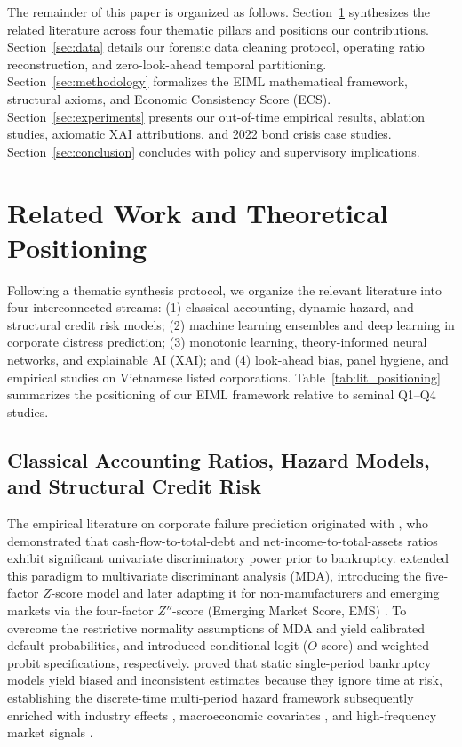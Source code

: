 \documentclass[pdflatex,sn-mathphys-num,twocolumn]{sn-jnl}
\theoremstyle{thmstyleone}
\theoremstyle{thmstyletwo}
\theoremstyle{thmstylethree}
\begin{document}
The remainder of this paper is organized as follows. Section~\ref{sec:literature} synthesizes the related literature across four thematic pillars and positions our contributions. Section~\ref{sec:data} details our forensic data cleaning protocol, operating ratio reconstruction, and zero-look-ahead temporal partitioning. Section~\ref{sec:methodology} formalizes the EIML mathematical framework, structural axioms, and Economic Consistency Score (ECS). Section~\ref{sec:experiments} presents our out-of-time empirical results, ablation studies, axiomatic XAI attributions, and 2022 bond crisis case studies. Section~\ref{sec:conclusion} concludes with policy and supervisory implications.

\section{Related Work and Theoretical Positioning}
\label{sec:literature}

Following a thematic synthesis protocol, we organize the relevant literature into four interconnected streams: (1) classical accounting, dynamic hazard, and structural credit risk models; (2) machine learning ensembles and deep learning in corporate distress prediction; (3) monotonic learning, theory-informed neural networks, and explainable AI (XAI); and (4) look-ahead bias, panel hygiene, and empirical studies on Vietnamese listed corporations. Table~\ref{tab:lit_positioning} summarizes the positioning of our EIML framework relative to seminal Q1--Q4 studies.

\subsection{Classical Accounting Ratios, Hazard Models, and Structural Credit Risk}
The empirical literature on corporate failure prediction originated with \citet{beaver1966financial}, who demonstrated that cash-flow-to-total-debt and net-income-to-total-assets ratios exhibit significant univariate discriminatory power prior to bankruptcy. \citet{altman1968financial} extended this paradigm to multivariate discriminant analysis (MDA), introducing the five-factor $Z$-score model and later adapting it for non-manufacturers and emerging markets via the four-factor $Z''$-score (Emerging Market Score, EMS) \citep{altman1995emerging,altman2017financial}. To overcome the restrictive normality assumptions of MDA and yield calibrated default probabilities, \citet{ohlson1980financial} and \citet{zmijewski1984methodological} introduced conditional logit ($O$-score) and weighted probit specifications, respectively. \citet{shumway2001forecasting} proved that static single-period bankruptcy models yield biased and inconsistent estimates because they ignore time at risk, establishing the discrete-time multi-period hazard framework subsequently enriched with industry effects \citep{chava2004bankruptcy}, macroeconomic covariates \citep{tinoco2013financial,bauer2014are}, and high-frequency market signals \citep{campbell2008search}.
\end{document}
